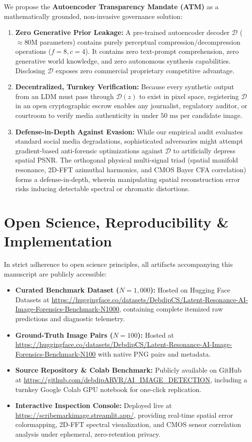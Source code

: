 \documentclass[11pt]{article}
\theoremstyle{definition}
\begin{document}
We propose the \textbf{Autoencoder Transparency Mandate (ATM)} as a mathematically grounded, non-invasive governance solution:
\begin{enumerate}
    \item \textbf{Zero Generative Prior Leakage:} A pre-trained autoencoder decoder $\mathcal{D}$ ($\approx 80\text{M}$ parameters) contains purely perceptual compression/decompression operations ($f=8, c=4$). It contains zero text-prompt comprehension, zero generative world knowledge, and zero autonomous synthesis capabilities. Disclosing $\mathcal{D}$ exposes zero commercial proprietary competitive advantage.
    \item \textbf{Decentralized, Turnkey Verification:} Because every synthetic output from an LDM must pass through $\mathcal{D}(z)$ to exist in pixel space, registering $\mathcal{D}$ in an open cryptographic escrow enables any journalist, regulatory auditor, or courtroom to verify media authenticity in under $50\text{ ms}$ per candidate image.
    \item \textbf{Defense-in-Depth Against Evasion:} While our empirical audit evaluates standard social media degradations, sophisticated adversaries might attempt gradient-based anti-forensic optimizations against $\mathcal{D}$ to artificially depress spatial PSNR. The orthogonal physical multi-signal triad (spatial manifold resonance, 2D-FFT azimuthal harmonics, and CMOS Bayer CFA correlation) forms a defense-in-depth, wherein manipulating spatial reconstruction error risks inducing detectable spectral or chromatic distortions.
\end{enumerate}

\section{Open Science, Reproducibility \& Implementation}
\label{sec:reproducibility}

In strict adherence to open science principles, all artifacts accompanying this manuscript are publicly accessible:
\begin{itemize}
    \item \textbf{Curated Benchmark Dataset ($N=1,000$):} Hosted on Hugging Face Datasets at \url{https://huggingface.co/datasets/DebdipCS/Latent-Resonance-AI-Image-Forensics-Benchmark-N1000}, containing complete itemized raw predictions and diagnostic telemetry.
    \item \textbf{Ground-Truth Image Pairs ($N=100$):} Hosted at \url{https://huggingface.co/datasets/DebdipCS/Latent-Resonance-AI-Image-Forensics-Benchmark-N100} with native PNG pairs and metadata.
    \item \textbf{Source Repository \& Colab Benchmark:} Publicly available on GitHub at \url{https://github.com/debdipARVR/AI_IMAGE_DETECTION}, including a turnkey Google Colab GPU notebook for one-click replication.
    \item \textbf{Interactive Inspection Console:} Deployed live at \url{https://scribemarkimage.streamlit.app/}, providing real-time spatial error colormapping, 2D-FFT spectral visualization, and CMOS sensor correlation analysis under ephemeral, zero-retention privacy.
\end{itemize}
\end{document}
